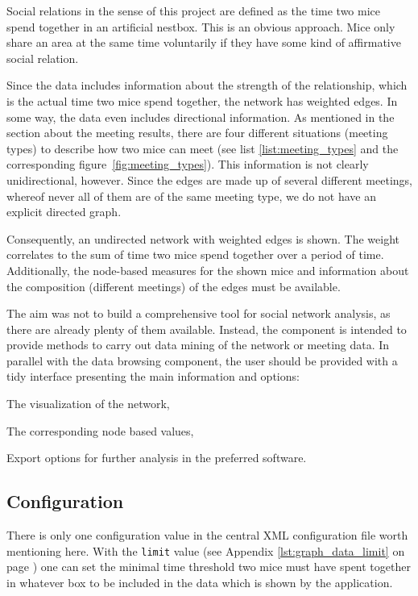 Social relations in the sense of this project are defined as the time two mice spend together in an artificial nestbox. This is an obvious approach. Mice only share an area at the same time voluntarily if they have some kind of affirmative social relation.

Since the data includes information about the strength of the relationship, which is the actual time two mice spend together, the network has weighted edges. In some way, the data even includes directional information. As mentioned in the section about the meeting results, there are four different situations (meeting types) to describe how two mice can meet (see list \ref{list:meeting_types} and the corresponding figure~\ref{fig:meeting_types}). This information is not clearly unidirectional, however. Since the edges are made up of several different meetings, whereof never all of them are of the same meeting type, we do not have an explicit directed graph.

Consequently, an undirected network with weighted edges is shown. The weight correlates to the sum of time two mice spend together over a period of time. Additionally, the node-based measures for the shown mice and information about the composition (different meetings) of the edges must be available.

The aim was not to build a comprehensive tool for social network analysis, as there are already plenty of them available. Instead, the component is intended to provide methods to carry out data mining of the network or meeting data. In parallel with the data browsing component, the user should be provided with a tidy interface presenting the main information and options:

\begin{mylist}
\item The visualization of the network,
\item The corresponding node based values,
\item Export options for further analysis in the preferred software.
\end{mylist}

\subsection{Configuration}
\label{subsec:graph_config}

There is only one configuration value in the central XML configuration file worth mentioning here. With the \lstinline|limit| value (see Appendix \ref{lst:graph_data_limit} on page \pageref{lst:graph_data_limit}) one can set the minimal time threshold two mice must have spent together in whatever box to be included in the data which is shown by the application. 

